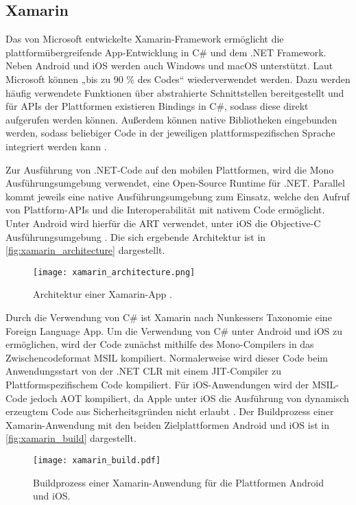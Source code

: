 \subsection{Xamarin}
\label{sec:frameworks_xamarin}

Das von Microsoft entwickelte Xamarin-Framework ermöglicht die plattformübergreifende App-Entwicklung in C\# und dem .NET Framework.
Neben Android und iOS werden auch Windows und macOS unterstützt.
Laut Microsoft können „bis zu 90 \% des Codes“ \cite{Xamarin_Homepage} wiederverwendet werden.
Dazu werden häufig verwendete Funktionen über abstrahierte Schnittstellen bereitgestellt und für \acp{API} der Plattformen existieren Bindings in C\#, sodass diese direkt aufgerufen werden können.
Außerdem können native Bibliotheken eingebunden werden, sodass beliebiger Code in der jeweiligen plattformspezifischen Sprache integriert werden kann \cite{Xamarin_Android}.


Zur Ausführung von .NET-Code auf den mobilen Plattformen, wird die Mono Ausführungsumgebung verwendet, eine Open-Source Runtime für .NET.
Parallel kommt jeweils eine native Ausführungsumgebung zum Einsatz, welche den Aufruf von Plattform-\acp{API} und die Interoperabilität mit nativem Code ermöglicht.
Unter Android wird hierfür die \ac{ART} verwendet, unter iOS die Objective-C Ausführungsumgebung \cite{Xamarin_iOS,Xamarin_Android}.
Die sich ergebende Architektur ist in \autoref{fig:xamarin_architecture} dargestellt.
\begin{figure}[h]
    \centering
    \texttt{[image: xamarin\_architecture.png]}
    \caption{Architektur einer Xamarin-App \cite{Xamarin_Homepage}.}
    \label{fig:xamarin_architecture}
\end{figure}


Durch die Verwendung von C\# ist Xamarin nach Nunkessers Taxonomie \cite{Nunkesser_Taxonomy_Apps} eine Foreign Language App.
Um die Verwendung von C\# unter Android und iOS zu ermöglichen, wird der Code zunächst mithilfe des Mono-Compilers in das Zwischencodeformat \ac{MSIL} kompiliert.
Normalerweise wird dieser Code beim Anwendungsstart von der .NET \ac{CLR} mit einem \ac{JIT}-Compiler zu Plattformspezifischem Code kompiliert.
Für iOS-Anwendungen wird der \ac{MSIL}-Code jedoch \ac{AOT} kompiliert, da Apple unter iOS die Ausführung von dynamisch erzeugtem Code aus Sicherheitsgründen nicht erlaubt \cite{Xamarin_iOS}.
Der Buildprozess einer Xamarin-Anwendung mit den beiden Zielplattformen Android und iOS ist in \autoref{fig:xamarin_build} dargestellt.
\begin{figure}[h]
    \centering
    \texttt{[image: xamarin\_build.pdf]}
    \caption{Buildprozess einer Xamarin-Anwendung für die Plattformen Android und iOS.}
    \label{fig:xamarin_build}
\end{figure}


